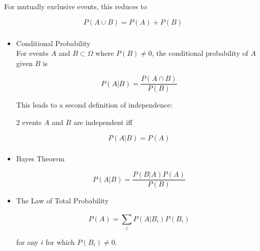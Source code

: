 \documentclass[t,xcolor=pdftex,dvipsnames,table]{beamer}
\begin{document}
\begin{frame}{}

For mutually exclusive events, this reduces to

\[ \boxed{ P(A \cup B) = P(A) + P(B) } \]

\vspace{.5cm}
\begin{center}
\end{center}
\end{frame}
 
\begin{frame}\frametitle{} 
\begin{itemize}

\item Conditional Probability \\
For events $A$ and $B \subset \Omega$ where $P(B) \neq 0$, the conditional probability of $A$ given $B$ is

\[  \boxed{ P(A | B) = \frac{ P(A \cap B)}{P(B)} } \]

\vspace{.5cm}
This leads to a second definition of independence:

2 events $A$ and $B$ are independent iff

\[ \boxed{ P(A | B) = P(A)  }\]

\end{itemize}
\end{frame}

\begin{frame}\frametitle{} 
\begin{itemize}

\item Bayes Theorem

\[  \boxed{ P(A | B) = \frac{ P(B | A) P(A)}{P(B)} } \]

\href{https://en.wikipedia.org/wiki/Confusion_of_the_inverse}{}

\vspace{.5cm}
\item The Law of Total Probability
 
 \[ \boxed{  P(A) = \sum_{i}^{} P(A | B_{i}) P(B_{i}) } \]
 
 for any $i$ for which $P(B_{i}) \neq 0$.

\end{itemize}
\end{frame}
\end{document}
